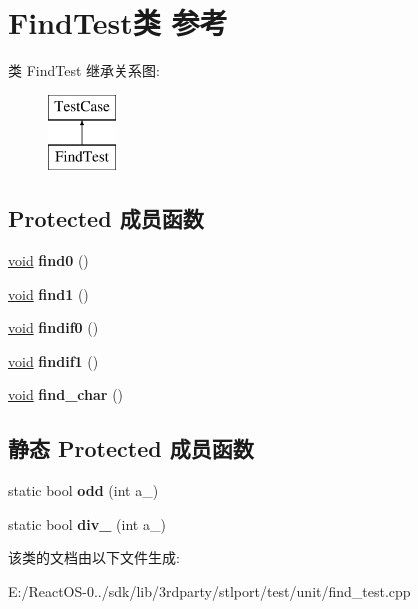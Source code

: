 \hypertarget{class_find_test}{}\section{Find\+Test类 参考}
\label{class_find_test}
类 Find\+Test 继承关系图\+:\begin{figure}[H]
\begin{center}
\leavevmode
\includegraphics[height=2.000000cm]{class_find_test}
\end{center}
\end{figure}
\subsection*{Protected 成员函数}
\begin{DoxyCompactItemize}
\item 
\mbox{\label{class_find_test_af3486bf6a08ede2afb4d8cd406de8d3a}} 
\hyperlink{interfacevoid}{void} {\bfseries find0} ()
\item 
\mbox{\label{class_find_test_a23b8d31b43d332bde83fc417e5d35211}} 
\hyperlink{interfacevoid}{void} {\bfseries find1} ()
\item 
\mbox{\label{class_find_test_abcfe89fc9a4e5d4172177e2ea67ac903}} 
\hyperlink{interfacevoid}{void} {\bfseries findif0} ()
\item 
\mbox{\label{class_find_test_a6f37046e949e86c56113371680047b17}} 
\hyperlink{interfacevoid}{void} {\bfseries findif1} ()
\item 
\mbox{\label{class_find_test_a0f7bd0757f87488de8845f2a99e7df2c}} 
\hyperlink{interfacevoid}{void} {\bfseries find\+\_\+char} ()
\end{DoxyCompactItemize}
\subsection*{静态 Protected 成员函数}
\begin{DoxyCompactItemize}
\item 
\mbox{\label{class_find_test_a0b6bb519a20c0a279f619c91c2133107}} 
static bool {\bfseries odd} (int a\+\_\+)
\item 
\mbox{\label{class_find_test_a769274c515672109f964c1fe7fda6ab0}} 
static bool {\bfseries div\+\_} (int a\+\_\+)
\end{DoxyCompactItemize}


该类的文档由以下文件生成\+:\begin{DoxyCompactItemize}
\item 
E\+:/\+React\+O\+S-\/0../sdk/lib/3rdparty/stlport/test/unit/find\+\_\+test.\+cpp\end{DoxyCompactItemize}
